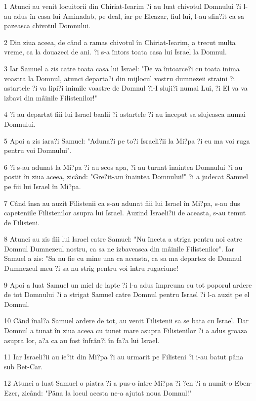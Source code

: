\par 1 Atunci au venit locuitorii din Chiriat-Iearim ?i au luat chivotul Domnului ?i l-au adus în casa lui Aminadab, pe deal, iar pe Eleazar, fiul lui, l-au sfin?it ca sa pazeasca chivotul Domnului.
\par 2 Din ziua aceea, de când a ramas chivotul în Chiriat-Iearim, a trecut multa vreme, ca la douazeci de ani. ?i s-a întors toata casa lui Israel la Domnul.
\par 3 Iar Samuel a zis catre toata casa lui Israel: "De va întoarce?i cu toata inima voastra la Domnul, atunci departa?i din mijlocul vostru dumnezeii straini ?i astartele ?i va lipi?i inimile voastre de Domnul ?i-I sluji?i numai Lui, ?i El va va izbavi din mâinile Filistenilor!"
\par 4 ?i au departat fiii lui Israel baalii ?i astartele ?i au început sa slujeasca numai Domnului.
\par 5 Apoi a zis iara?i Samuel: "Aduna?i pe to?i Israeli?ii la Mi?pa ?i eu ma voi ruga pentru voi Domnului".
\par 6 ?i s-au adunat la Mi?pa ?i au scos apa, ?i au turnat înaintea Domnului ?i au postit în ziua aceea, zicând: "Gre?it-am înaintea Domnului!" ?i a judecat Samuel pe fiii lui Israel în Mi?pa.
\par 7 Când însa au auzit Filistenii ca s-au adunat fiii lui Israel în Mi?pa, s-au dus capeteniile Filistenilor asupra lui Israel. Auzind Israeli?ii de aceasta, s-au temut de Filisteni.
\par 8 Atunci au zis fiii lui Israel catre Samuel: "Nu înceta a striga pentru noi catre Domnul Dumnezeul nostru, ca sa ne izbaveasca din mâinile Filistenilor". Iar Samuel a zis: "Sa nu fie cu mine una ca aceasta, ca sa ma departez de Domnul Dumnezeul meu ?i sa nu strig pentru voi întru rugaciune!
\par 9 Apoi a luat Samuel un miel de lapte ?i l-a adus împreuna cu tot poporul ardere de tot Domnului ?i a strigat Samuel catre Domnul pentru Israel ?i l-a auzit pe el Domnul.
\par 10 Când înal?a Samuel ardere de tot, au venit Filistenii sa se bata cu Israel. Dar Domnul a tunat în ziua aceea cu tunet mare asupra Filistenilor ?i a adus groaza asupra lor, a?a ca au fost înfrân?i în fa?a lui Israel.
\par 11 Iar Israeli?ii au ie?it din Mi?pa ?i au urmarit pe Filisteni ?i i-au batut pâna sub Bet-Car.
\par 12 Atunci a luat Samuel o piatra ?i a pus-o între Mi?pa ?i ?en ?i a numit-o Eben-Ezer, zicând: "Pâna la locul acesta ne-a ajutat noua Domnul!"

